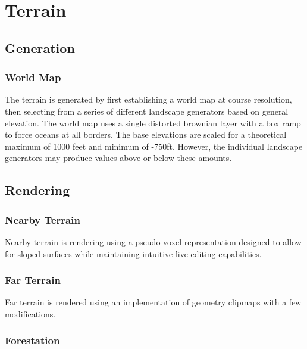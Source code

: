 \chapter{Terrain}

\section{Generation}

\subsection{World Map}

The terrain is generated by first establishing a world map at course resolution, then selecting from a series of different landscape generators based on general elevation.
The world map uses a single distorted brownian layer with a box ramp to force oceans at all borders.
The base elevations are scaled for a theoretical maximum of 1000 feet and minimum of -750ft.
However, the individual landscape generators may produce values above or below these amounts.


\section{Rendering}

\subsection{Nearby Terrain}

Nearby terrain is rendering using a pseudo-voxel representation designed to allow for sloped surfaces while maintaining intuitive live editing capabilities.

\subsection{Far Terrain}

Far terrain is rendered using an implementation of geometry clipmaps with a few modifications.

\subsection{Forestation}
